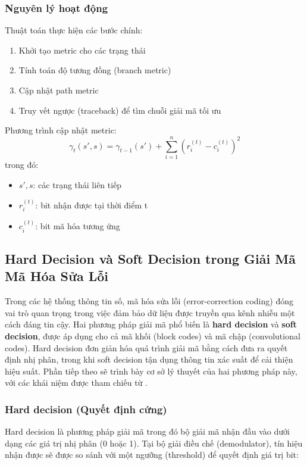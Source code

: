 \subsubsection*{Nguyên lý hoạt động}
Thuật toán thực hiện các bước chính:
\begin{enumerate}
	\item Khởi tạo metric cho các trạng thái
	\item Tính toán độ tương đồng (branch metric)
	\item Cập nhật path metric
	\item Truy vết ngược (traceback) để tìm chuỗi giải mã tối ưu
\end{enumerate}

Phương trình cập nhật metric:
\[
\gamma_t(s',s) = \gamma_{t-1}(s') + \sum_{i=1}^n (r_i^{(t)} - c_i^{(t)})^2
\]
trong đó:
\begin{itemize}[label=-]
	\item $s', s$: các trạng thái liên tiếp
	\item $r_i^{(t)}$: bit nhận được tại thời điểm t
	\item $c_i^{(t)}$: bit mã hóa tương ứng
\end{itemize}

\subsection{Hard Decision và Soft Decision trong Giải Mã Mã Hóa Sửa Lỗi}

Trong các hệ thống thông tin số, mã hóa sửa lỗi (error-correction coding) đóng vai trò quan trọng trong việc đảm bảo dữ liệu được truyền qua kênh nhiễu một cách đáng tin cậy. Hai phương pháp giải mã phổ biến là \textbf{hard decision} và \textbf{soft decision}, được áp dụng cho cả mã khối (block codes) và mã chập (convolutional codes). Hard decision đơn giản hóa quá trình giải mã bằng cách đưa ra quyết định nhị phân, trong khi soft decision tận dụng thông tin xác suất để cải thiện hiệu suất. Phần tiếp theo sẽ trình bày cơ sở lý thuyết của hai phương pháp này, với các khái niệm được tham chiếu từ \cite{Clark1981}.

\subsubsection{Hard decision (Quyết định cứng)}
Hard decision là phương pháp giải mã trong đó bộ giải mã nhận đầu vào dưới dạng các giá trị nhị phân (0 hoặc 1). Tại bộ giải điều chế (demodulator), tín hiệu nhận được sẽ được so sánh với một ngưỡng (threshold) để quyết định giá trị bit:


